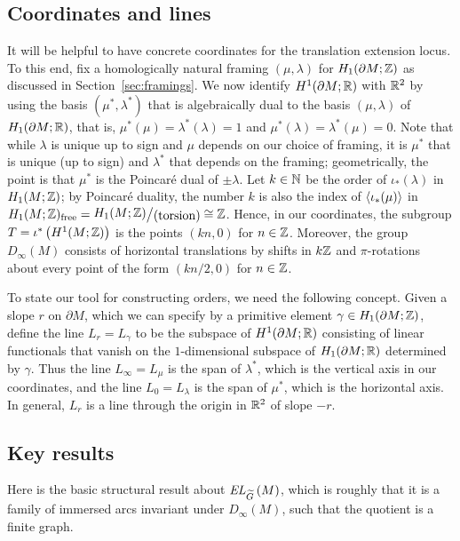 \documentclass[tikz, sepfignums, defaultenums]{nmd/article}
\newcommand{\inc}{\iota}
\newcommand{\TEL}[1]{\mathit{EL}_\Gtil\left(#1\right)}
\newcommand{\SymTEL}[1]{D_\infty\left(#1\right)}
\newcommand{\Honefree}{H_1(M; \Z)_{\mathrm{free}}}
\newcommand{\Honefreedef}{%
\rightquom{H_1(M; \Z)}{(\mathrm{torsion})}{1pt}{\big}}
\begin{document}
\subsection{Coordinates and lines}\label{subsection: coordinates}
It will be helpful to have concrete coordinates for the translation
extension locus. To this end, fix a homologically natural framing
$(\mu, \lambda)$ for $H_1(\partial M; {\mathbb Z})$ as discussed in
Section~\ref{sec:framings}.  We now identify $H^1(\partial M; {\mathbb R})$
with ${\mathbb R}^2$ by using the basis $(\mu^*, \lambda^*)$ that is
algebraically dual to the basis $(\mu, \lambda)$ of
$H_1(\partial M; {\mathbb R})$, that is, $\mu^*(\mu) = \lambda^*(\lambda) = 1$
and $\mu^*(\lambda) = \lambda^*(\mu) = 0$.  Note that while $\lambda$
is unique up to sign and $\mu$ depends on our choice of framing, it is
$\mu^*$ that is unique (up to sign) and $\lambda^*$ that depends on
the framing; geometrically, the point is that $\mu^*$ is the
Poincar\'e dual of $\pm \lambda$.  Let $k \in {\mathbb N}$ be the order of
$\inc_*(\lambda)$ in $H_1(M; {\mathbb Z})$; by Poincar\'e duality, the number
$k$ is also the index of $\pair{\inc_*(\mu)}$ in
$\Honefree = \Honefreedef \cong \Z$.  Hence, in our coordinates, the
subgroup $T = \inc^*\left(H^1(M; \Z)\right)$ is the points $(kn, 0)$
for $n \in {\mathbb Z}$.  Moreover, the group $\SymTEL{M}$ consists of
horizontal translations by shifts in $k{\mathbb Z}$ and $\pi$\hyp rotations
about every point of the form $(kn/2, 0)$ for $n \in {\mathbb Z}$.

To state our tool for constructing orders, we need the following
concept.  Given a slope $r$ on $\partial M$, which we can specify by a
primitive element $\gamma \in H_1(\partial M; {\mathbb Z})$, define the line
$L_r = L_\gamma$ to be the subspace of $H^1(\partial M; {\mathbb R})$
consisting of linear functionals that vanish on the $1$-dimensional
subspace of $H_1(\partial M; {\mathbb R})$ determined by $\gamma$.  Thus the
line $L_\infty = L_\mu$ is the span of $\lambda^*$, which is the
vertical axis in our coordinates, and the line $L_0 = L_\lambda$ is
the span of $\mu^*$, which is the horizontal axis.  In general,
$L_{r}$ is a line through the origin in ${\mathbb R}^2$ of slope $-r$.

\subsection{Key results}

Here is the basic structural result about $\TEL{M}$, which is
roughly that it is a family of immersed arcs invariant under
$\SymTEL{M}$, such that the quotient is a finite
graph.
\end{document}
